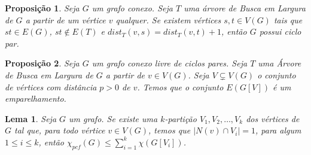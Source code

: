\documentclass[12pt]{article}
\begin{document}
 
 \def\changemargin#1#2{\list{}{\rightmargin#2\leftmargin#1}\item[]} 
\let\endchangemargin=\endlist 
\newcommand{\wbigcup}{\mathop{\widetilde{\bigcup}}\displaylimits}

\newcommand{\overbar}[1]{\mkern 1.5mu\overline{\mkern-1.5mu#1\mkern-1.5mu}\mkern 1.5mu}
\newcommand{\ie}{\textit{i}.\textit{e}.} 
\newcommand{\blceil}{\left \lceil}
\newcommand{\brceil}{\right \rceil} 
\newcommand{\blfloor}{\left \lfloor}
\newcommand{\brfloor}{\right \rfloor} 
\newcommand{\defcomunidade}{Def.1 \ (a) \text{,} \ (b) \ \text{e} \ (c)}

\newcommand{\newbegin}{\vspace{0.5cm}}

\newcommand{\newl}{\vspace{0.1cm}}
\newcommand{\escolhe}[2]{\resizebox{!}{15pt}{$\displaystyle \binom{#1}{#2}$}}

\newtheorem{definicao}{Def} 
\newtheorem{exemplo}{Exemplo}  
\newtheorem{lema}{Lema} 
\newtheorem{teo}{Teorema} 
\newtheorem{cor}{Corolário}
\newtheorem{prop}{Proposição}
\newtheorem{defi}{Definição}



\begin{prop}
	\label{prop1}
	Seja $G$ um grafo conexo. Seja $T$ uma árvore de Busca em Largura de $G$ a partir de um vértice $v$ qualquer. Se existem vértices $s, t \in V(G)$ tais que $st \in E(G)$, $st \notin E(T)$ e $dist_T(v, s) = dist_T(v, t) + 1$, então $G$ possui ciclo par.
\end{prop} \newbegin

\begin{prop}
	\label{prop2}
	Seja $G$ um grafo conexo livre de ciclos pares. Seja $T$ uma Árvore de Busca em Largura de $G$ a partir de $v \in V(G)$. Seja $V \subsetneq V(G)$ o conjunto de vértices com distância $p > 0$ de $v$. Temos que o conjunto $E(G[V])$ é um emparelhamento.
\end{prop} \newbegin


\begin{lema}  
\label{lema1}
Seja $G$ um grafo. Se existe uma $k$-partição $V_1, V_2, \ldots ,V_k$ dos vértices de $G$ tal que, para todo vértice $v \in V(G)$, temos que $|N(v) \cap V_i| = 1$, para algum $1 \leq i \leq k$, então $\chi_{pcf}(G) \leq  \sum\limits_{i = 1}^{k} \chi(G[V_i])$.
\end{lema}
\end{document}
